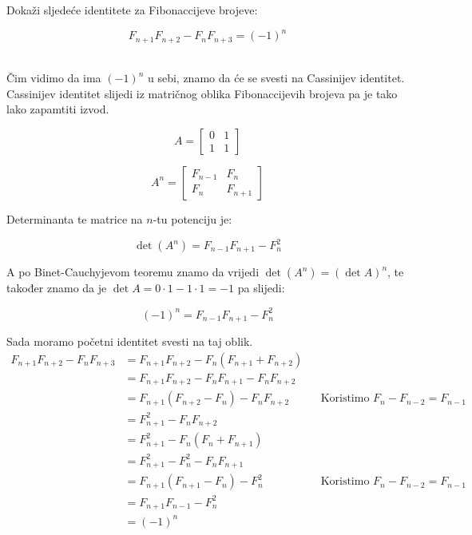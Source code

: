 \documentclass[exam.tex]{subfiles}
\begin{document}
	\begin{subtask}
		Dokaži sljedeće identitete za Fibonaccijeve brojeve:
	
		\[ F_{n + 1} F_{n + 2} - F_n F_{n + 3} = (-1)^n \]\\
	\end{subtask}
	
	Čim vidimo da ima \( (-1)^n \) u sebi, znamo da će se svesti na Cassinijev identitet. Cassinijev identitet slijedi iz matričnog oblika Fibonaccijevih brojeva pa je tako lako zapamtiti izvod.
	
	$$ A =  \begin{bmatrix}
		0 & 1 \\
		1 & 1 
	\end{bmatrix}  $$
	
	$$ A^n =  \begin{bmatrix}
		F_{n - 1} & F_n \\
		F_n & F_{n + 1}
	\end{bmatrix} $$
	
	Determinanta te matrice na \(n\)-tu potenciju je:
	
	\[ \det (A^n) = F_{n - 1} F_{n + 1} - F^2_n \]
	
	A po Binet-Cauchyjevom teoremu znamo da vrijedi \( \det (A^n) = (\det A)^n \), te također znamo da je \( \det A = 0 \cdot 1 - 1 \cdot 1 = -1 \) pa slijedi:
	
	\[ (-1)^n = F_{n - 1} F_{n + 1} - F^2_n \]
	
	Sada moramo početni identitet svesti na taj oblik. 
	\begin{align*}
		F_{n + 1} F_{n + 2} - F_n F_{n + 3} &= F_{n + 1} F_{n + 2} - F_n (F_{n + 1} + F_{n + 2}) \\
		&= F_{n + 1} F_{n + 2} - F_n F_{n + 1} - F_n F_{n + 2} \\
		&= F_{n + 1} (F_{n + 2} - F_n) - F_n F_{n + 2} && \text{Koristimo } F_n - F_{n - 2} = F_{n - 1}\\
		&= F^2_{n + 1} - F_n F_{n + 2} \\
		&= F^2_{n + 1} - F_n (F_n + F_{n + 1}) \\
		&= F^2_{n + 1} - F^2_n - F_n F_{n + 1} \\
		&= F_{n + 1} (F_{n + 1} - F_n) - F_n^2 && \text{Koristimo } F_n - F_{n - 2} = F_{n - 1}\\
		&= F_{n + 1} F_{n - 1} - F_n^2 \\
		&= (-1)^n
	\end{align*}
\end{document}

